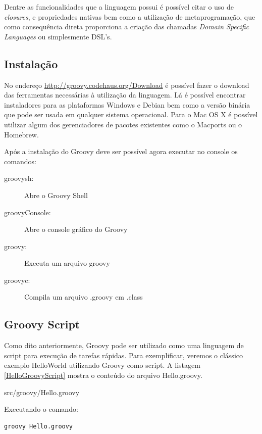 \documentclass[12pt]{article}
\begin{document}
    Dentre as funcionalidades que a linguagem possui é possível citar o uso de 
    \emph{closures},  e propriedades nativas bem como a utilização de metaprogramação, 
    que como consequência direta proporciona a criação das chamadas \emph{Domain 
    Specific Languages} ou simplesmente DSL's.

\subsection{Instalação}
    
    No endereço \url{http://groovy.codehaus.org/Download} é possível fazer o 
    download das ferramentas necessárias à utilização da linguagem. Lá é possível
    encontrar instaladores para as plataformas Windows e Debian bem como a versão
    binária que pode ser usada em qualquer sistema operacional. Para o Mac OS X 
    é possível utilizar algum dos gerenciadores de pacotes existentes como o 
    Macports ou o Homebrew.

    Após a instalação do Groovy deve ser possível agora executar no console os comandos:
    
    \begin{description}
        \item [groovysh:] Abre o Groovy Shell
        \item [groovyConsole:] Abre o console gráfico do Groovy 
        \item [groovy:] Executa um arquivo groovy
        \item [groovyc:] Compila um arquivo .groovy em .class
    \end{description}
    
\subsection{Groovy Script}
    
    Como dito anteriormente, Groovy pode ser utilizado como uma linguagem de 
    script para execução de tarefas rápidas. Para exemplificar, veremos o clássico
    exemplo HelloWorld utilizando Groovy como script. A listagem \ref{HelloGroovyScript}
    mostra o conteúdo do arquivo Hello.groovy. 
    
    
                    {src/groovy/Hello.groovy}

    Executando o comando:
    \begin{lstlisting}[basicstyle={\small \ttfamily}]
        groovy Hello.groovy
    \end{lstlisting}
    
\end{document}
